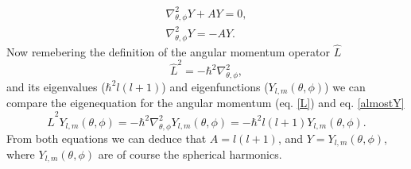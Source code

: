 \begin{questions}
\begin{solution}
\begin{eqnarray}
    \nabla^2_{\theta,\phi} Y  + AY = 0, \nonumber \\
    \nabla^2_{\theta,\phi} Y = -AY.
    \label{almostY}
  \end{eqnarray}
  Now remebering the definition of the angular momentum operator $\hat{L}$
  \begin{equation*}
    \hat{L}^2 = -\hbar^2 \nabla^2_{\theta,\phi},
  \end{equation*}
  and its eigenvalues ($\hbar^2 l (l+1)$) and eigenfunctions ($Y_{l,m}(\theta,\phi)$) we can compare the eigenequation for the angular momentum (eq. \ref{L}) and eq. \ref{almostY}
  \begin{equation}
    \hat{L}^2 Y_{l,m}(\theta,\phi)= -\hbar^2 \nabla^2_{\theta,\phi} Y_{l,m}(\theta,\phi) = - \hbar^2 l (l+1) Y_{l,m}(\theta,\phi).
    \label{L}
  \end{equation}
  From both equations we can deduce that $A = l(l+1)$, and $Y = Y_{l,m}(\theta,\phi) $, where $Y_{l,m}(\theta,\phi)$ are of course the spherical harmonics.


\end{solution}
\end{questions}
